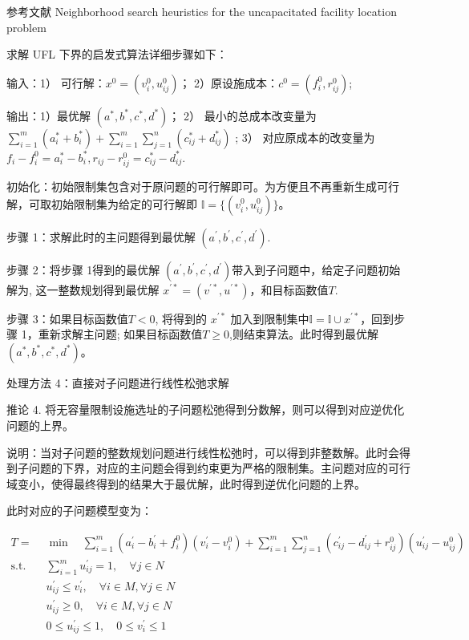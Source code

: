 \documentclass[UTF8]{article}
\begin{document}
参考文献 Neighborhood search heuristics for the uncapacitated
facility location problem

求解 UFL 下界的启发式算法详细步骤如下：

输入：1） 可行解：$x^0=(v_i^0,u_{ij}^0)$； 2）原设施成本：$c^0=(f_i^0,r_{ij}^0)$;

输出：1）最优解 $(a^{*},b^{*},c^{*},d^{*})$；
2） 最小的总成本改变量为
$\sum_{i=1}^m(a^{*}_i+b^{*}_i)+\sum_{i=1}^m\sum_{j=1}^n(c^{*}_{ij}+d^{*}_{ij})$ ;
3） 对应原成本的改变量为 $f_i-f_i^0 = a^{*}_i-b^{*}_i,r_{ij}-r_{ij}^0=c^{*}_{ij}-d^{*}_{ij}$.

初始化：初始限制集包含对于原问题的可行解即可。为方便且不再重新生成可行解，可取初始限制集为给定的可行解即 $\mathbb{I} = \{(v_i^0,u_{ij}^0)\} $。

步骤 1：求解此时的主问题得到最优解 $(a^{'},b^{'},c^{'},d^{'})$.

步骤 2：将步骤 1得到的最优解 $(a^{'},b^{'},c^{'},d^{'})$带入到子问题中，给定子问题初始解为$ $, 这一整数规划得到最优解 $x^{'*}=(v^{'*},u^{'*})$，和目标函数值$T$.

步骤 3：如果目标函数值$T< 0$, 将得到的 $x^{'*}$ 加入到限制集中$\mathbb{I} = \mathbb{I} \cup x^{'*}$，回到步骤 1，重新求解主问题;  如果目标函数值$T\geq 0$,则结束算法。此时得到最优解$(a^{*},b^{*},c^{*},d^{*})$。


处理方法 4：直接对子问题进行线性松弛求解

推论 4. 将无容量限制设施选址的子问题松弛得到分数解，则可以得到对应逆优化问题的上界。

说明：当对子问题的整数规划问题进行线性松弛时，可以得到非整数解。此时会得到子问题的下界，对应的主问题会得到约束更为严格的限制集。主问题对应的可行域变小，使得最终得到的结果大于最优解，此时得到逆优化问题的上界。

此时对应的子问题模型变为：

\begin{align*}
T = &\min \quad \sum_{i=1}^m(a_i^{'}-b_i^{'}+f_i^0)(v_i^{'}-v_i^{0})+\sum_{i=1}^m\sum_{j=1}^n(c_{ij}^{'}-d_{ij}^{'}+r_{ij}^0)(u_{ij}^{'}-u_{ij}^{0}) \\
\text{s.t.}\quad & \sum_{i=1}^m u_{ij}^{'} =1, \quad \forall j\in N \\
& u_{ij}^{'} \leq v_{i}^{'}, \quad \forall i \in M, \forall j \in N \\
& u_{ij}^{'} \geq 0, \quad \forall i \in M, \forall j \in N \\
& 0 \leq u_{ij}^{'} \leq 1 ,\quad 0 \leq v_{i}^{'} \leq 1
\end{align*}
\end{document}
